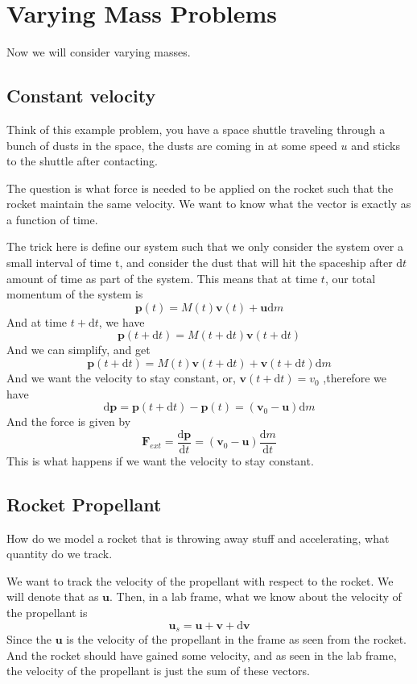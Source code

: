 \documentclass[12pt]{article}
\newcommand{\dydx}[2]{\frac{\text{d} #1}{\text{d} #2}}
\newcommand{\paren}[1]{\left( #1 \right)}
\begin{document}
\section{Varying Mass Problems}
Now we will consider varying masses.

\subsection{Constant velocity}

Think of this example problem, you have a space shuttle traveling through a bunch of dusts in the space, the dusts are coming in at some speed $u$ and sticks to the shuttle after contacting. 

The question is what force is needed to be applied on the rocket such that the rocket maintain the same velocity. We want to know what the vector is exactly as a function of time. 

The trick here is define our system such that we only consider the system over a small interval of time $\text{t}$, and consider the dust that will hit the spaceship after $\text{d}t$ amount of time as part of the system. This means that at time $t$, our total momentum of the system is
\[
\mathbf{p}(t) = M(t)\mathbf{v}(t) + \mathbf{u}\text{d}m
\]
And at time $t+\text{d}t$, we have
\[
\mathbf{p}(t+\text{d}t) = M(t+\text{d}t)\mathbf{v}(t+\text{d}t)
\]
And we can simplify, and get
\[
\mathbf{p}(t+\text{d}t) = M(t)\mathbf{v}(t+\text{d}t) + \mathbf{v}(t+\text{d}t)\text{d}m
\]
And we want the velocity to stay constant, or, $\mathbf{v}(t+\text{d}t) = v_0$ ,therefore we have
\[
\text{d}\mathbf{p} = \mathbf{p}(t+\text{d}t) - \mathbf{p}(t) = \paren{\mathbf{v}_0 - \mathbf{u}}\text{d}m 
\]
And the force is given by
\[
\mathbf{F}_{ext} = \dydx{\mathbf{p}}{t}=\paren{\mathbf{v}_0 - \mathbf{u}}\dydx{m}{t}
\]
This is what happens if we want the velocity to stay constant.

\subsection{Rocket Propellant}
How do we model a rocket that is throwing away stuff and accelerating, what quantity do we track. 

We want to track the velocity of the propellant with respect to the rocket. We will denote that as $\mathbf{u}$. Then, in a lab frame, what we know about the velocity of the propellant is
\[
\mathbf{u}_s = \mathbf{u}+\mathbf{v}+\text{d}\mathbf{v}
\]
Since the $\mathbf{u}$ is the velocity of the propellant in the frame as seen from the rocket. And the rocket should have gained some velocity, and as seen in the lab frame, the velocity of the propellant is just the sum of these vectors. 
\end{document}
